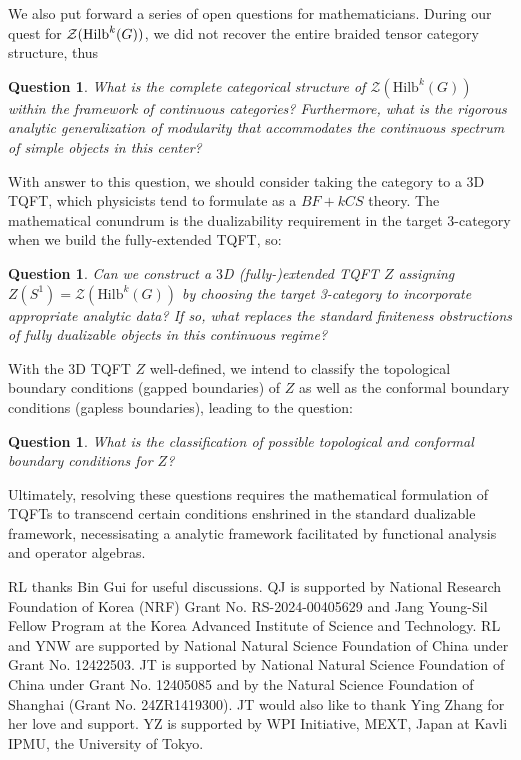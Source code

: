 \documentclass[a4paper,11pt]{article}
\newtheorem{question}[lemma]{Question}
\def\CZ{\mathcal{Z}}
\def\hilb{{\rm Hilb}}
\begin{document}
We also put forward a series of open questions for mathematicians. During our quest for $\CZ(\hilb^k(G))$, we did not recover the entire braided tensor category structure, thus
\begin{question}
    What is the complete categorical structure of $\CZ(\text{Hilb}^k(G))$ within the framework of continuous categories? Furthermore, what is the rigorous analytic generalization of modularity that accommodates the continuous spectrum of simple objects in this center?
\end{question}
With answer to this question, we should consider taking the category to a $3$D TQFT, which physicists tend to formulate as a $BF+k CS$ theory. The mathematical conundrum is the dualizability requirement in the target $3$-category when we build the fully-extended TQFT, so:
\begin{question}
    Can we construct a $3$D (fully-)extended TQFT $Z$ assigning $Z(S^1) = \CZ(\text{Hilb}^k(G))$ by choosing the target 3-category to incorporate appropriate analytic data? If so, what replaces the standard finiteness obstructions of fully dualizable objects in this continuous regime?
\end{question}
With the $3$D TQFT $Z$ well-defined, we intend to classify the topological boundary conditions (gapped boundaries) of $Z$ as well as the conformal boundary conditions (gapless boundaries), leading to the question:
\begin{question}
    What is the classification of possible topological and conformal boundary conditions for $Z$?
\end{question}
Ultimately, resolving these questions requires the mathematical formulation of TQFTs to transcend certain conditions enshrined in the standard dualizable framework, necessisating a analytic framework facilitated by functional analysis and operator algebras.



\acknowledgments
RL thanks Bin Gui for useful discussions. QJ is supported by National Research Foundation of Korea (NRF) Grant No. RS-2024-00405629 and Jang Young-Sil Fellow Program at the Korea Advanced Institute of Science and Technology. RL and YNW are supported by National Natural Science Foundation of China under Grant No. 12422503. JT is supported by National Natural Science Foundation of China under Grant No. 12405085 and by the Natural Science Foundation of Shanghai (Grant No. 24ZR1419300). JT would also like to thank Ying Zhang for her love and support. YZ is supported by WPI Initiative, MEXT, Japan at Kavli IPMU, the University of Tokyo.
\end{document}
